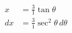 \documentclass[preview]{standalone}
\begin{document}
\begin{align*}
x&=\frac{3}{1}\tan\theta \\ dx&= \frac{3}{1}\sec^2\theta \, d\theta
\end{align*}
\end{document}
